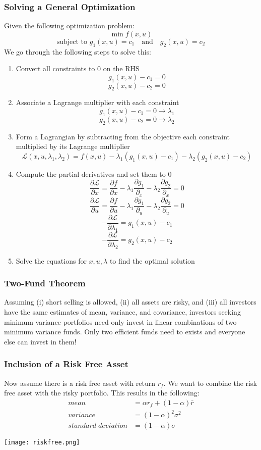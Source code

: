 \documentclass[11pt]{article}
\newcommand{\Lagr}{\mathcal{L}}
\begin{document}
\subsubsection{Solving a General Optimization}
Given the following optimization problem:
$$ \min f(x,u)$$
$$ \text{subject to } g_1(x,u) = c_1 \quad \text{and} \quad g_2(x,u) = c_2 $$ 
We go through the following steps to solve this:
\begin{enumerate}
\item Convert all constraints to 0 on the RHS
$$ g_1(x,u) - c_1  = 0$$
$$ g_2(x,u) - c_2 = 0$$
\item Associate a Lagrange multiplier with each constraint
$$ g_1(x,u) - c_1  = 0 \rightarrow \lambda_1$$
$$ g_2(x,u) - c_2 = 0 \rightarrow \lambda_2$$
\item Form a Lagrangian by subtracting from the objective each constraint multiplied by its Lagrange multiplier
$$ \Lagr(x, u,\lambda_1, \lambda_2) = f(x,u) - \lambda_1(g_1(x,u) - c_1) - \lambda_2(g_2(x,u) - c_2)$$
\item Compute the partial derivatives and set them to 0
$$ \frac{\partial \Lagr}{\partial x} = \frac{\partial f}{\partial x } - \lambda_1 \frac{\partial g_1}{\partial _x} - \lambda_2 \frac{\partial g_2}{\partial _x} = 0$$
$$ \frac{\partial \Lagr}{\partial u} = \frac{\partial f}{\partial u } - \lambda_1 \frac{\partial g_1}{\partial _u} - \lambda_2 \frac{\partial g_2}{\partial _u} = 0$$
$$ -\frac{\partial \Lagr}{\partial \lambda_1} = g_1(x,u) - c_1$$
$$ -\frac{\partial \Lagr}{\partial \lambda_2} = g_2(x,u) - c_2$$
\item Solve the equations for $x, u, \lambda$ to find the optimal solution
\end{enumerate}
\subsubsection{Two-Fund Theorem}
Assuming (i) short selling is allowed, (ii) all assets are risky, and (iii) all investors have the same estimates of mean, variance, and covariance, investors seeking minimum variance portfolios need only invest in linear combinations of two minimum variance funds. Only two efficient funds need to exists and everyone else can invest in them!

\subsubsection{Inclusion of a Risk Free Asset}
Now assume there is a risk free asset with return $r_f$.  We want to combine the risk free asset with the risky portfolio.  This results in the following:
\begin{align*}
mean &= \alpha r_f + (1-\alpha) \bar{r} \\
variance &= (1-\alpha)^2 \sigma^2 \\
standard \; deviation & = (1-\alpha) \sigma
\end{align*}
\begin{center}
\texttt{[image: riskfree.png]} 
\end{center}
\end{document}
